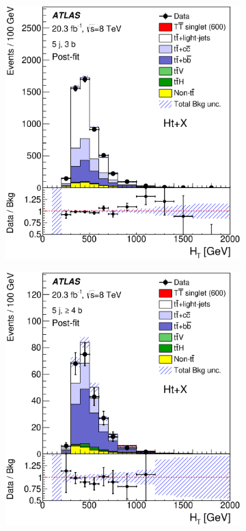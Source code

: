 \begin{figure}[!tp]
\begin{center}
\begin{subfigure}{0.49\textwidth}
\includegraphics[width=\textwidth]{Analysis/Figures_HtX/HtXPaper/HtX/postfit_unblind/HTAll_5jetex3btagex8TeV.eps}
\caption{}\end{subfigure}
  \begin{subfigure}{0.49\textwidth}
\includegraphics[width=\textwidth]{Analysis/Figures_HtX/HtXPaper/HtX/postfit_unblind/HTAll_5jetex4btagin8TeV.eps} 

\end{subfigure}
\end{center}
\end{figure}
